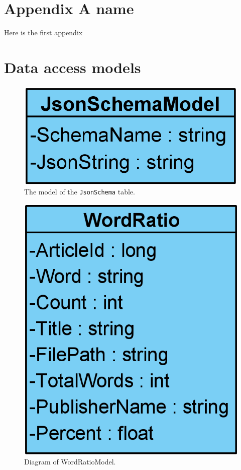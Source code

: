 \chapter{Appendix A name}\label{ch:appAlabel}
Here is the first appendix

\chapter{Data access models}\label{AppDataAccess}
\begin{figure}[H]
    \centering
    \includegraphics[scale=0.25]{Images/JsonSchemaModel.png}
    \caption{The model of the \texttt{JsonSchema} table.}
    \label{JsonSchemaModel}
\end{figure}
\begin{figure}[H]
    \centering
    \includegraphics[scale=0.25]{Images/WordRatioModel.png}
    \caption{Diagram of WordRatioModel.}
    \label{WordRatioModel}
\end{figure}